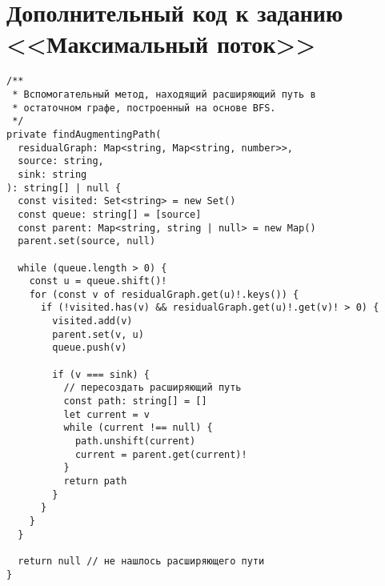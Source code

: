 \section{Дополнительный код к заданию <<Максимальный поток>>}
\label{app:max-flow}

\begin{verbatim}
/**
 * Вспомогательный метод, находящий расширяющий путь в
 * остаточном графе, построенный на основе BFS.
 */
private findAugmentingPath(
  residualGraph: Map<string, Map<string, number>>,
  source: string,
  sink: string
): string[] | null {
  const visited: Set<string> = new Set()
  const queue: string[] = [source]
  const parent: Map<string, string | null> = new Map()
  parent.set(source, null)

  while (queue.length > 0) {
    const u = queue.shift()!
    for (const v of residualGraph.get(u)!.keys()) {
      if (!visited.has(v) && residualGraph.get(u)!.get(v)! > 0) {
        visited.add(v)
        parent.set(v, u)
        queue.push(v)

        if (v === sink) {
          // пересоздать расширяющий путь
          const path: string[] = []
          let current = v
          while (current !== null) {
            path.unshift(current)
            current = parent.get(current)!
          }
          return path
        }
      }
    }
  }

  return null // не нашлось расширяющего пути
}
\end{verbatim}